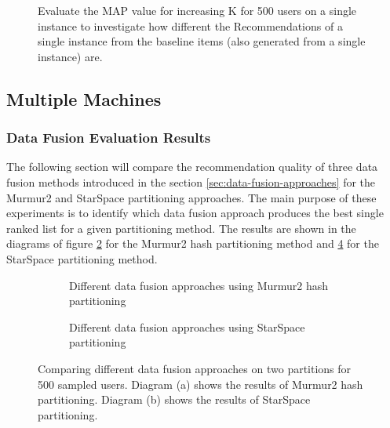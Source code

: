 \begin{figure}[!htb]
    \centering
    
    \caption{Evaluate the MAP value for increasing K for 500 users on a single instance to investigate how different the Recommendations of a single instance from the baseline items  (also generated from a single instance) are.}
    \label{plot:single-partition}
\end{figure}

\subsection{Multiple Machines}
\label{subsec:eval-multiple-machines}

\subsubsection{Data Fusion Evaluation Results}
\label{subsubsec:eval-data-fusion}
The following section will compare the recommendation quality of three data fusion methods introduced in the section \ref{sec:data-fusion-approaches} for the Murmur2 and StarSpace partitioning approaches. The main purpose of these experiments is to identify which data fusion approach produces the best single ranked list for a given partitioning method. The results are shown in the diagrams of figure \ref{plot:murmur2-data-fusion} for the Murmur2 hash partitioning method and \ref{plot:star-space-data-fusion} for the StarSpace partitioning method.


\begin{figure}[!htb]
    \centering
    \begin{subfigure}{\textwidth}
        \centering
        
        \caption{Different data fusion approaches using Murmur2 hash partitioning}
        \label{plot:murmur2-data-fusion}
    \end{subfigure}\qquad

    \begin{subfigure}{\textwidth}
        \centering
        
        \caption{Different data fusion approaches using StarSpace partitioning}
        \label{plot:star-space-data-fusion}
    \end{subfigure}\qquad
    \caption{Comparing different data fusion approaches on two partitions for 500 sampled users. Diagram (a) shows the results of Murmur2 hash partitioning. Diagram (b) shows the results of StarSpace partitioning.}
\end{figure}


